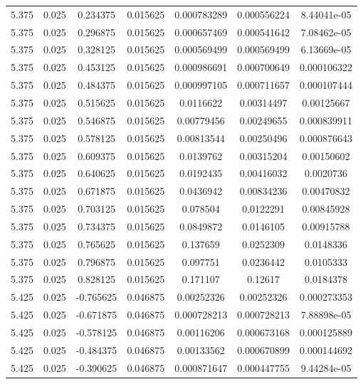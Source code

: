\begin{table}[bh]
\begin{center}
{\begin{tabular}{ccccccc}
5.375	 & 0.025 & 	0.234375	 & 0.015625	 & 0.000783289	 & 0.000556224	 & 8.44041e-05 \\ 
5.375	 & 0.025 & 	0.296875	 & 0.015625	 & 0.000657469	 & 0.000541642	 & 7.08462e-05 \\ 
5.375	 & 0.025 & 	0.328125	 & 0.015625	 & 0.000569499	 & 0.000569499	 & 6.13669e-05 \\ 
5.375	 & 0.025 & 	0.453125	 & 0.015625	 & 0.000986691	 & 0.000700649	 & 0.000106322 \\ 
5.375	 & 0.025 & 	0.484375	 & 0.015625	 & 0.000997105	 & 0.000711657	 & 0.000107444 \\ 
5.375	 & 0.025 & 	0.515625	 & 0.015625	 & 0.0116622	 & 0.00314497	 & 0.00125667 \\ 
5.375	 & 0.025 & 	0.546875	 & 0.015625	 & 0.00779456	 & 0.00249655	 & 0.000839911 \\ 
5.375	 & 0.025 & 	0.578125	 & 0.015625	 & 0.00813544	 & 0.00250496	 & 0.000876643 \\ 
5.375	 & 0.025 & 	0.609375	 & 0.015625	 & 0.0139762	 & 0.00315204	 & 0.00150602 \\ 
5.375	 & 0.025 & 	0.640625	 & 0.015625	 & 0.0192435	 & 0.00416032	 & 0.0020736 \\ 
5.375	 & 0.025 & 	0.671875	 & 0.015625	 & 0.0436942	 & 0.00834236	 & 0.00470832 \\ 
5.375	 & 0.025 & 	0.703125	 & 0.015625	 & 0.078504	 & 0.0122291	 & 0.00845928 \\ 
5.375	 & 0.025 & 	0.734375	 & 0.015625	 & 0.0849872	 & 0.0146105	 & 0.00915788 \\ 
5.375	 & 0.025 & 	0.765625	 & 0.015625	 & 0.137659	 & 0.0252309	 & 0.0148336 \\ 
5.375	 & 0.025 & 	0.796875	 & 0.015625	 & 0.097751	 & 0.0236442	 & 0.0105333 \\ 
5.375	 & 0.025 & 	0.828125	 & 0.015625	 & 0.171107	 & 0.12617	 & 0.0184378 \\ 
5.425	 & 0.025 & 	-0.765625	 & 0.046875	 & 0.00252326	 & 0.00252326	 & 0.000273353 \\ 
5.425	 & 0.025 & 	-0.671875	 & 0.046875	 & 0.000728213	 & 0.000728213	 & 7.88898e-05 \\ 
5.425	 & 0.025 & 	-0.578125	 & 0.046875	 & 0.00116206	 & 0.000673168	 & 0.000125889 \\ 
5.425	 & 0.025 & 	-0.484375	 & 0.046875	 & 0.00133562	 & 0.000670899	 & 0.000144692 \\ 
5.425	 & 0.025 & 	-0.390625	 & 0.046875	 & 0.000871647	 & 0.000447755	 & 9.44284e-05 \\ 

\end{tabular}}
\end{center}
\end{table}

